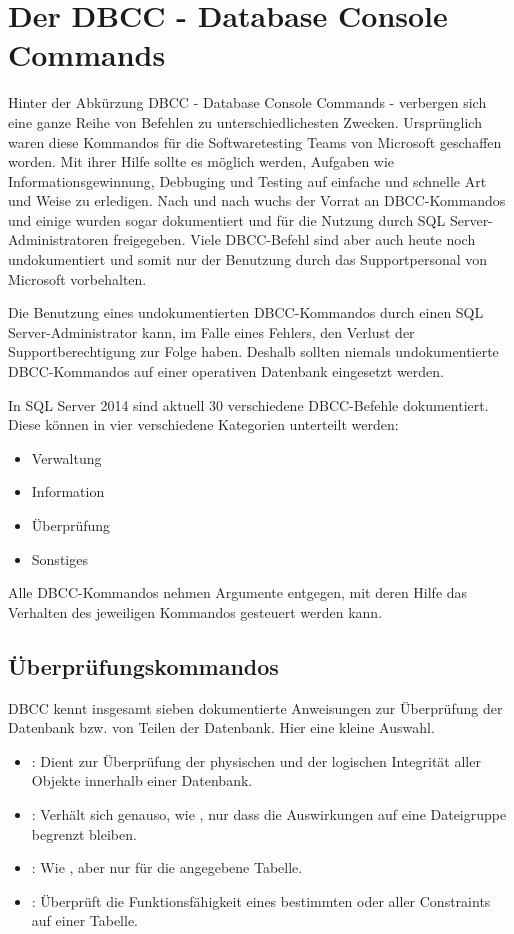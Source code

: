     \section{Der DBCC - Database Console Commands}
      Hinter der Abkürzung DBCC - Database Console Commands - verbergen sich
      eine ganze Reihe von Befehlen zu unterschiedlichesten Zwecken.
      Ursprünglich waren diese Kommandos für die Softwaretesting Teams von
      Microsoft geschaffen worden. Mit ihrer Hilfe sollte es möglich
      werden, Aufgaben wie Informationsgewinnung, Debbuging und Testing auf
      einfache und schnelle Art und Weise zu erledigen. Nach und nach wuchs
      der Vorrat an DBCC-Kommandos und einige wurden sogar dokumentiert und
      für die Nutzung durch SQL Server-Administratoren freigegeben. Viele
      DBCC-Befehl sind aber auch heute noch undokumentiert und somit nur der
      Benutzung durch das Supportpersonal von Microsoft vorbehalten.
      \begin{merke}
        Die Benutzung eines undokumentierten DBCC-Kommandos durch einen SQL
        Server-Administrator kann, im Falle eines Fehlers, den Verlust der
        Supportberechtigung zur Folge haben. Deshalb sollten niemals
        undokumentierte DBCC-Kommandos auf einer operativen Datenbank
        eingesetzt werden.
      \end{merke}
      In SQL Server 2014 sind aktuell 30 verschiedene DBCC-Befehle
      dokumentiert. Diese können in vier verschiedene Kategorien unterteilt
      werden:
      \begin{itemize}
          \item Verwaltung
          \item Information
          \item Überprüfung
          \item Sonstiges
      \end{itemize}
      Alle DBCC-Kommandos nehmen Argumente entgegen, mit deren Hilfe das
      Verhalten des jeweiligen Kommandos gesteuert werden kann.
      \subsection{Überprüfungskommandos}
        DBCC kennt  insgesamt sieben dokumentierte Anweisungen zur Überprüfung
        der Datenbank bzw. von Teilen der Datenbank. Hier eine kleine Auswahl.
        \begin{itemize}
          \item {}: Dient zur Überprüfung der
          physischen und der logischen Integrität aller Objekte innerhalb
          einer Datenbank.
          \item {}: Verhält sich genauso, wie
          , nur dass die Auswirkungen auf eine
          Dateigruppe begrenzt bleiben.
          \item {}: Wie , aber nur für die angegebene Tabelle.
          \item {}: Überprüft die
          Funktionsfähigkeit eines bestimmten oder aller Constraints auf
          einer Tabelle.
        \end{itemize}
